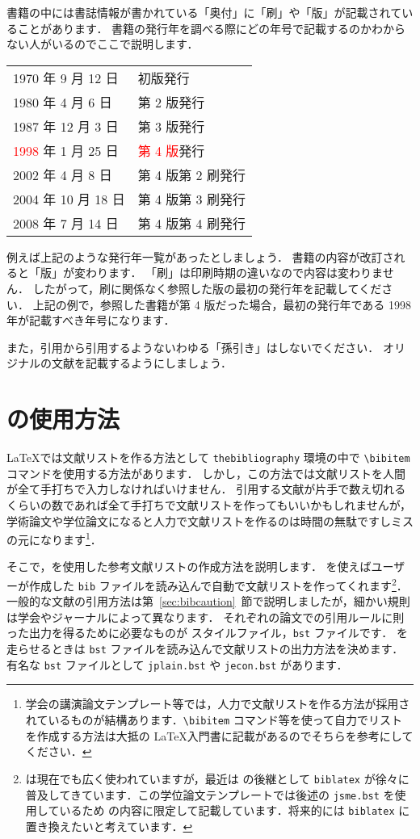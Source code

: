 書籍の中には書誌情報が書かれている「奥付」に「刷」や「版」が記載されていることがあります．
書籍の発行年を調べる際にどの年号で記載するのかわからない人がいるのでここで説明します．
\begin{center}
    \begin{tabular}{ll}
        1970 年 9 月 12 日  & 初版発行 \\
        1980 年 4 月 6 日   & 第 2 版発行 \\
        1987 年 12 月 3 日  & 第 3 版発行 \\
        \textcolor{red}{1998} 年 1 月 25 日  & \textcolor{red}{第 4 版}発行 \\
        2002 年 4 月 8 日   & 第 4 版第 2 刷発行 \\
        2004 年 10 月 18 日 & 第 4 版第 3 刷発行 \\
        2008 年 7 月 14 日  & 第 4 版第 4 刷発行
    \end{tabular}
\end{center}
例えば上記のような発行年一覧があったとしましょう．
書籍の内容が改訂されると「版」が変わります．
「刷」は印刷時期の違いなので内容は変わりません．
したがって，刷に関係なく参照した版の最初の発行年を記載してください．
上記の例で，参照した書籍が第 4 版だった場合，最初の発行年である 1998 年が記載すべき年号になります．

また，引用から引用するようないわゆる「孫引き」はしないでください．
オリジナルの文献を記載するようにしましょう．


\section{\BibTeX の使用方法}
\label{sec:howtouse_bibtex}

\LaTeX では文献リストを作る方法として \verb|thebibliography| 環境の中で \verb|\bibitem| コマンドを使用する方法があります．
しかし，この方法では文献リストを人間が全て手打ちで入力しなければいけません．
引用する文献が片手で数え切れるくらいの数であれば全て手打ちで文献リストを作ってもいいかもしれませんが，学術論文や学位論文になると人力で文献リストを作るのは時間の無駄ですしミスの元になります\footnote{学会の講演論文テンプレート等では，人力で文献リストを作る方法が採用されているものが結構あります．\texttt{\textbackslash bibitem} コマンド等を使って自力でリストを作成する方法は大抵の \LaTeX 入門書に記載があるのでそちらを参考にしてください．}．

そこで，\BibTeX を使用した参考文献リストの作成方法を説明します．
\BibTeX を使えばユーザーが作成した \verb|bib| ファイルを読み込んで自動で文献リストを作ってくれます\footnote{\BibTeX は現在でも広く使われていますが，最近は \BibTeX の後継として \texttt{biblatex} が徐々に普及してきています．この学位論文テンプレートでは後述の \texttt{jsme.bst} を使用しているため \BibTeX の内容に限定して記載しています．将来的には \texttt{biblatex} に置き換えたいと考えています．}．
一般的な文献の引用方法は第~\ref{sec:bibcaution}~節で説明しましたが，細かい規則は学会やジャーナルによって異なります．
それぞれの論文での引用ルールに則った出力を得るために必要なものが \BibTeX スタイルファイル，\verb|bst| ファイルです．
\BibTeX を走らせるときは \verb|bst| ファイルを読み込んで文献リストの出力方法を決めます．
有名な \verb|bst| ファイルとして \verb|jplain.bst| や \verb|jecon.bst| があります．

